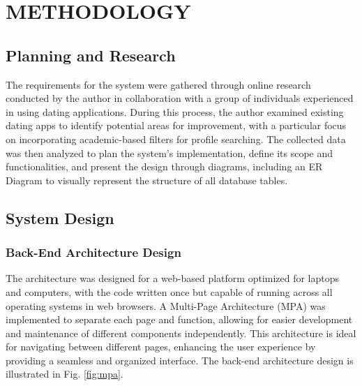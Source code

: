 \setlength{\footskip}{8mm}
\chapter{METHODOLOGY}
\section{Planning and Research}
The requirements for the system were gathered through online research conducted by the author in collaboration with a group of individuals experienced in using dating applications. During this process, the author examined existing dating apps to identify potential areas for improvement, with a particular focus on incorporating academic-based filters for profile searching. The collected data was then analyzed to plan the system's implementation, define its scope and functionalities, and present the design through diagrams, including an ER Diagram to visually represent the structure of all database tables.
\section{System Design}
    \subsection{Back-End Architecture Design}
    The architecture was designed for a web-based platform optimized for laptops and computers, with the code written once but capable of running across all operating systems in web browsers. A Multi-Page Architecture (MPA) was implemented to separate each page and function, allowing for easier development and maintenance of different components independently. This architecture is ideal for navigating between different pages, enhancing the user experience by providing a seamless and organized interface. The back-end architecture design is illustrated in Fig. \ref{fig:mpa}.
